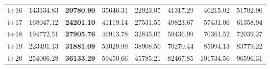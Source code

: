 \begin{table}[H]
\begin{tabular}{lrrrrrrr}
t+16  & 143334.83  & \textbf{20780.90}  & 35646.31  & 22923.05  & 41317.29  & 46215.02  & 51702.90  \\
t+17  & 168047.12  & \textbf{24201.10}  & 41119.14  & 27531.55  & 49823.67  & 57431.06  & 61358.94  \\
t+18  & 194772.51  & \textbf{27905.76}  & 46913.78  & 32845.05  & 59436.99  & 70361.52  & 72039.27  \\
t+19  & 223491.13  & \textbf{31881.09}  & 53029.99  & 38908.56  & 70270.44  & 85094.13  & 83779.22  \\
t+20  & 254006.28  & \textbf{36133.29}  & 59450.66  & 45785.21  & 82467.85  & 101734.56  & 96596.31  \\

\bottomrule
\end{tabular}
\end{table}
